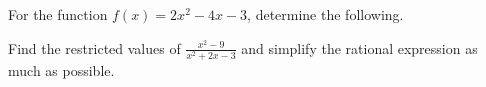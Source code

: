\documentclass[11pt]{exam}
\begin{document}
\begin{questions}
\question[15] For the function $f(x)=2x^2-4x-3$, determine the following.
\noaddpoints
\vspace{2pt}
\addpoints

\question[5] Find the restricted values of $\displaystyle \frac{x^2 - 9}{x^2 + 2x - 3}$ and simplify the rational expression as much as possible.
\addpoints
\end{questions}
\end{document}
